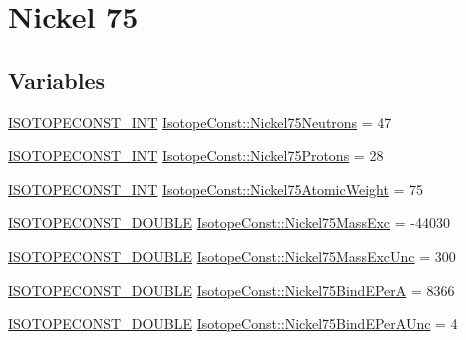 \hypertarget{group___isotope_const-_nickel-_ni75}{}\section{Nickel 75}
\label{group___isotope_const-_nickel-_ni75}
\subsection*{Variables}
\begin{DoxyCompactItemize}
\item 
\mbox{\hyperlink{group___isotope_const-_macros_ga5f18360b3e99483a35c32d789e62621c}{I\+S\+O\+T\+O\+P\+E\+C\+O\+N\+S\+T\+\_\+\+I\+NT}} \mbox{\hyperlink{group___isotope_const-_nickel-_ni75_gad663100dddc8d603b14e408bc8319a1f}{Isotope\+Const\+::\+Nickel75\+Neutrons}} = 47
\item 
\mbox{\hyperlink{group___isotope_const-_macros_ga5f18360b3e99483a35c32d789e62621c}{I\+S\+O\+T\+O\+P\+E\+C\+O\+N\+S\+T\+\_\+\+I\+NT}} \mbox{\hyperlink{group___isotope_const-_nickel-_ni75_gae4ce79b6303039934c8fd53e90ab9c1d}{Isotope\+Const\+::\+Nickel75\+Protons}} = 28
\item 
\mbox{\hyperlink{group___isotope_const-_macros_ga5f18360b3e99483a35c32d789e62621c}{I\+S\+O\+T\+O\+P\+E\+C\+O\+N\+S\+T\+\_\+\+I\+NT}} \mbox{\hyperlink{group___isotope_const-_nickel-_ni75_ga0f39b09c6e90e8462c07a4515b33202e}{Isotope\+Const\+::\+Nickel75\+Atomic\+Weight}} = 75
\item 
\mbox{\hyperlink{group___isotope_const-_macros_ga8f45a7272ce02c0b4c65c44636ed719a}{I\+S\+O\+T\+O\+P\+E\+C\+O\+N\+S\+T\+\_\+\+D\+O\+U\+B\+LE}} \mbox{\hyperlink{group___isotope_const-_nickel-_ni75_gaeac1a0605e80f4172bed59038c52537e}{Isotope\+Const\+::\+Nickel75\+Mass\+Exc}} = -\/44030
\item 
\mbox{\hyperlink{group___isotope_const-_macros_ga8f45a7272ce02c0b4c65c44636ed719a}{I\+S\+O\+T\+O\+P\+E\+C\+O\+N\+S\+T\+\_\+\+D\+O\+U\+B\+LE}} \mbox{\hyperlink{group___isotope_const-_nickel-_ni75_ga7311f914cf57eefa0b2e3a11b83e95d6}{Isotope\+Const\+::\+Nickel75\+Mass\+Exc\+Unc}} = 300
\item 
\mbox{\hyperlink{group___isotope_const-_macros_ga8f45a7272ce02c0b4c65c44636ed719a}{I\+S\+O\+T\+O\+P\+E\+C\+O\+N\+S\+T\+\_\+\+D\+O\+U\+B\+LE}} \mbox{\hyperlink{group___isotope_const-_nickel-_ni75_ga5c40aea70957502a2b629471bab43e59}{Isotope\+Const\+::\+Nickel75\+Bind\+E\+PerA}} = 8366
\item 
\mbox{\hyperlink{group___isotope_const-_macros_ga8f45a7272ce02c0b4c65c44636ed719a}{I\+S\+O\+T\+O\+P\+E\+C\+O\+N\+S\+T\+\_\+\+D\+O\+U\+B\+LE}} \mbox{\hyperlink{group___isotope_const-_nickel-_ni75_ga27838add740f3b746b79682b50f47b79}{Isotope\+Const\+::\+Nickel75\+Bind\+E\+Per\+A\+Unc}} = 4

\end{DoxyCompactItemize}
